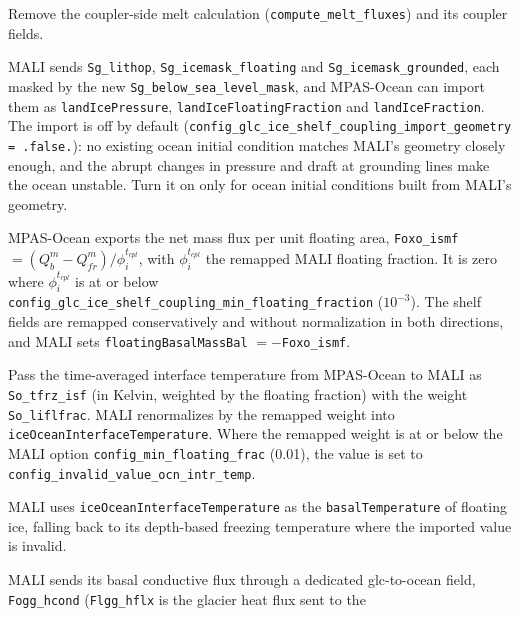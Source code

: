 \documentclass[11pt]{report}
\newcommand{\cmark}{\ding{51}}%
\newcommand{\done}{\rlap{$\square$}{\raisebox{2pt}{\large\hspace{1pt}\cmark}}%
\hspace{-2.5pt}}
\begin{document}
\begin{todolist}
    \item[\done] Remove the coupler-side melt calculation (\texttt{compute\_melt\_fluxes})
    and its coupler fields.
    \item[\done] MALI sends \texttt{Sg\_lithop}, \texttt{Sg\_icemask\_floating} and
    \texttt{Sg\_icemask\_grounded}, each masked by the new \texttt{Sg\_below\_sea\_level\_mask},
    and MPAS-Ocean can import them as \texttt{landIcePressure},
    \texttt{landIceFloatingFraction} and \texttt{landIceFraction}.  The import is off by
    default (\texttt{config\_\allowbreak glc\_\allowbreak ice\_\allowbreak shelf\_\allowbreak coupling\_\allowbreak import\_\allowbreak geometry = .false.}): no
    existing ocean initial condition matches MALI's geometry closely enough, and the
    abrupt changes in pressure and draft at grounding lines make the ocean unstable.
    Turn it on only for ocean initial conditions built from MALI's geometry.
    \item[\done] MPAS-Ocean exports the net mass flux per unit floating area,
    \texttt{Foxo\_ismf} $= (Q_b^m - Q_{fr}^m)/\phi_i^{t_{cpl}}$, with $\phi_i^{t_{cpl}}$
    the remapped MALI floating fraction.  It is zero where $\phi_i^{t_{cpl}}$ is at or
    below \texttt{config\_\allowbreak glc\_\allowbreak ice\_\allowbreak shelf\_\allowbreak coupling\_\allowbreak min\_\allowbreak floating\_\allowbreak fraction} ($10^{-3}$).
    The shelf fields are remapped conservatively and without normalization in both
    directions, and MALI sets \texttt{floatingBasalMassBal} $= -$\texttt{Foxo\_ismf}.
    \item[\done] Pass the time-averaged interface temperature from MPAS-Ocean to MALI as
    \texttt{So\_tfrz\_isf} (in Kelvin, weighted by the floating fraction) with the weight
    \texttt{So\_liflfrac}.  MALI renormalizes by the remapped weight into
    \texttt{iceOceanInterfaceTemperature}.  Where the remapped weight is at or below the
    MALI option \texttt{config\_min\_floating\_frac} (0.01), the value is set to
    \texttt{config\_invalid\_value\_ocn\_intr\_temp}.
    \item[\done] MALI uses \texttt{iceOceanInterfaceTemperature} as the
    \texttt{basalTemperature} of floating ice, falling back to its depth-based freezing
    temperature where the imported value is invalid.
    \item[\done] MALI sends its basal conductive flux through a dedicated glc-to-ocean
    field, \texttt{Fogg\_hcond} (\texttt{Flgg\_hflx} is the glacier heat flux sent to the

\end{todolist}
\end{document}
